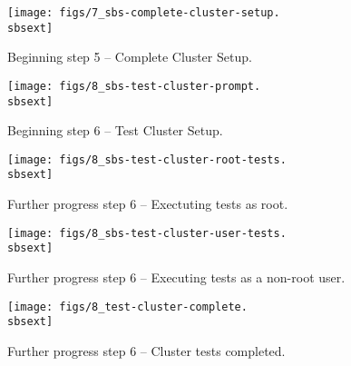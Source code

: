  

\begin{figure}[htbp]
   \begin{center}
     \texttt{[image: figs/7\_sbs-complete-cluster-setup.\\sbsext]}
     \caption{Beginning step 5 -- Complete Cluster Setup.}
     \label{fig:sbs-install-wizard-s5}
   \end{center}
 \end{figure}



 \begin{figure}[htbp]
   \begin{center}
     \texttt{[image: figs/8\_sbs-test-cluster-prompt.\\sbsext]}
     \caption{Beginning step 6 -- Test Cluster Setup.}
     \label{fig:sbs-install-wizard-s6}
   \end{center}
 \end{figure}


\begin{figure}[htbp]
  \begin{center}
    \texttt{[image: figs/8\_sbs-test-cluster-root-tests.\\sbsext]}
    \caption{Further progress step 6 -- Exectuting tests as root.}
    \label{fig:sbs-setup-test}
  \end{center}
\end{figure}

\begin{figure}[htbp]
  \begin{center}
    \texttt{[image: figs/8\_sbs-test-cluster-user-tests.\\sbsext]}
    \caption{Further progress step 6 -- Executing tests as a non-root user.}
    \label{fig:sbs-setup-test1}
  \end{center}
\end{figure}


\begin{figure}[htbp]
  \begin{center}
    \texttt{[image: figs/8\_test-cluster-complete.\\sbsext]}
    \caption{Further progress step 6 -- Cluster tests completed.}
    \label{fig:sbs-setup-test2}
  \end{center}
\end{figure}

